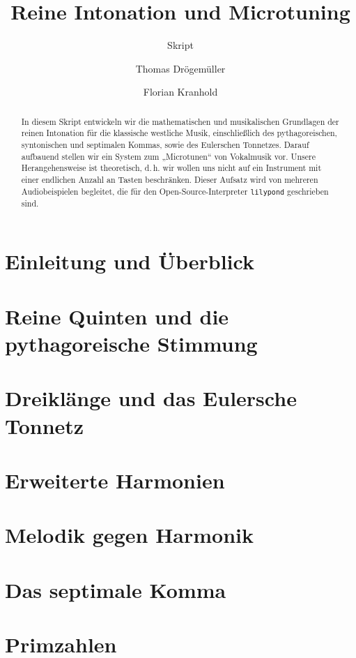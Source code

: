 \documentclass[ngerman,11pt]{scrartcl}
\title     {Reine Intonation und Microtuning}
\author    {Thomas Drögemüller\and Florian Kranhold}
\subtitle  {Skript}
\begin{document}
\maketitle

\begin{abstract}
  In diesem Skript entwickeln wir die mathematischen und musikalischen
  Grundlagen der reinen Intonation für die klassische westliche Musik,
  einschließlich des pythagoreischen, syntonischen und septimalen Kommas, sowie
  des Eulerschen Tonnetzes. Darauf aufbauend stellen wir ein System zum
  „Microtunen“ von Vokalmusik vor. Unsere Herangehensweise ist theoretisch,
  d.\,h. wir wollen uns nicht auf ein Instrument mit einer endlichen Anzahl an
  Tasten beschränken. Dieser Aufsatz wird von mehreren Audiobeispielen
  begleitet, die für den Open-Source-Interpreter \texttt{lilypond} geschrieben
  sind.
\end{abstract}

\section{Einleitung und Überblick}
\label{sec:int}


\section{Reine Quinten und die pythagoreische Stimmung}
\label{sec:pyth}


\section{Dreiklänge und das Eulersche Tonnetz}
\label{sec:tri}


\section{Erweiterte Harmonien}
\label{sec:quad}


\section{Melodik gegen Harmonik}
\label{sec:melody}


\section{Das septimale Komma}
\label{sec:sept}


\appendix
\section{Primzahlen}
\label{sec:primes}


\printbibliography[heading=bibintoc]
\end{document}
